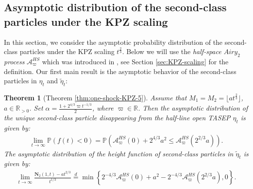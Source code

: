 \documentclass[12pt,a4paper]{amsart}
\newtheorem{theorem}{Theorem} %
\theoremstyle{remark}
\numberwithin{equation}{section} \numberwithin{theorem}{section}
\begin{document}
\subsection{Asymptotic distribution of the second-class particles under the KPZ scaling}
In this section, we consider the asymptotic probability distribution of the second-class particles under the KPZ scaling $t^{\frac23}$. Below we will use the \emph{half-space ${Airy}_2$ process} $\mathcal{A}_{\varpi}^{HS}$ which was introduced in \cite{BBCS18a}, see Section \ref{sec:KPZ-scaling} for the definition. Our first main result is the asymptotic behavior of the second-class particles in $\eta_t$ and $\tilde{\eta}_{t}$:
\begin{theorem}[Theorem \ref{thm:one-shock-KPZ-5}]
\label{thm:one-shock-KPZ}
Assume that $M_1=M_2=\lfloor at^{\frac23} \rfloor$, $a\in \mathbb{R}_{>0}$. Set $\alpha = \frac{1+2^{4/3}\varpi t^{-1/3}}{2}$, where $\varpi \in \mathbb{R}$. Then the asymptotic distribution  of the unique second-class particle disappearing from the half-line open TASEP $\eta_t$ is given by:
\begin{align}
\label{eq:one-shock-disappear}
\lim_{t \to \infty}\mathbb{P}(f(t)<0)  = \mathbb{P}\left(\mathcal{A}_{\varpi}^{HS}(0)+2^{4/3}a^2 \leq \mathcal{A}_{\varpi}^{HS}(2^{2/3}a)\right).
\end{align}
The asymptotic distribution  of the height function of second-class particles in $\tilde{\eta}_{t}$ is given by:
\begin{align}
\label{one-shock-kpz}
\lim_{t\to\infty}\frac{\mathbf{N}_{2} (1,t)-at^{2/3}}{t^{1/3}} \stackrel{d}{=} \min \left\{2^{-4/3}\mathcal{A}_{\varpi}^{HS}(0)+a^2 - 2^{-4/3}\mathcal{A}_{\varpi}^{HS}(2^{2/3}a),0 \right\}.
\end{align}
\end{theorem}
\end{document}
